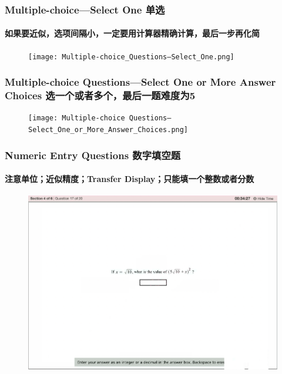 \documentclass[
	11pt, %
]{beamer}
\begin{document}

\begin{frame}
	\frametitle{Multiple-choice—Select One 单选}
	\framesubtitle{如果要近似，选项间隔小，一定要用计算器精确计算，最后一步再化简}
	\begin{figure}
		\texttt{[image: Multiple-choice\_Questions—Select\_One.png]}
	\end{figure}
\end{frame}

\begin{frame}
	\frametitle{Multiple-choice Questions—Select One or More Answer Choices 选一个或者多个，最后一题难度为5}
	\begin{figure}
		\texttt{[image: Multiple-choice Questions—Select\_One\_or\_More\_Answer\_Choices.png]}
	\end{figure}
\end{frame}

\begin{frame}
	\frametitle{Numeric Entry Questions 数字填空题}
	\framesubtitle{注意单位；近似精度；Transfer Display；只能填一个整数或者分数}
	\begin{figure}
		\includegraphics[width=0.9\linewidth]{Numeric_Entry_Questions.png}
	\end{figure}
\end{frame}
\end{document}
